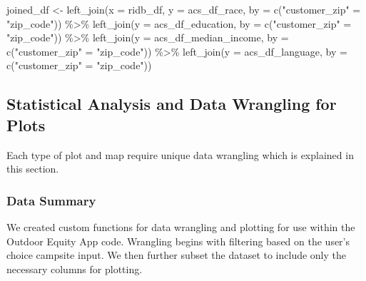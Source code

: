 \documentclass[
  11 pt,
  openany]{book}
\newenvironment{Shaded}{\begin{snugshade}}{\end{snugshade}}
\newcommand{\AttributeTok}[1]{\textcolor[rgb]{0.77,0.63,0.00}{#1}}
\newcommand{\FunctionTok}[1]{\textcolor[rgb]{0.00,0.00,0.00}{#1}}
\newcommand{\NormalTok}[1]{#1}
\newcommand{\OtherTok}[1]{\textcolor[rgb]{0.56,0.35,0.01}{#1}}
\newcommand{\SpecialCharTok}[1]{\textcolor[rgb]{0.00,0.00,0.00}{#1}}
\newcommand{\StringTok}[1]{\textcolor[rgb]{0.31,0.60,0.02}{#1}}
\begin{document}
\begin{Shaded}
\begin{Highlighting}[]
\NormalTok{joined\_df }\OtherTok{\textless{}{-}} 
  \FunctionTok{left\_join}\NormalTok{(}\AttributeTok{x =}\NormalTok{ ridb\_df,}
            \AttributeTok{y =}\NormalTok{ acs\_df\_race,}
            \AttributeTok{by =} \FunctionTok{c}\NormalTok{(}\StringTok{"customer\_zip"} \OtherTok{=} \StringTok{"zip\_code"}\NormalTok{)) }\SpecialCharTok{\%\textgreater{}\%} 
  \FunctionTok{left\_join}\NormalTok{(}\AttributeTok{y =}\NormalTok{ acs\_df\_education,}
            \AttributeTok{by =} \FunctionTok{c}\NormalTok{(}\StringTok{"customer\_zip"} \OtherTok{=} \StringTok{"zip\_code"}\NormalTok{)) }\SpecialCharTok{\%\textgreater{}\%} 
  \FunctionTok{left\_join}\NormalTok{(}\AttributeTok{y =}\NormalTok{ acs\_df\_median\_income,}
            \AttributeTok{by =} \FunctionTok{c}\NormalTok{(}\StringTok{"customer\_zip"} \OtherTok{=} \StringTok{"zip\_code"}\NormalTok{)) }\SpecialCharTok{\%\textgreater{}\%} 
  \FunctionTok{left\_join}\NormalTok{(}\AttributeTok{y =}\NormalTok{ acs\_df\_language,}
            \AttributeTok{by =} \FunctionTok{c}\NormalTok{(}\StringTok{"customer\_zip"} \OtherTok{=} \StringTok{"zip\_code"}\NormalTok{))}
\end{Highlighting}
\end{Shaded}

\hypertarget{statistical-analysis-and-data-wrangling-for-plots}{%
\subsection{Statistical Analysis and Data Wrangling for Plots}\label{statistical-analysis-and-data-wrangling-for-plots}}

Each type of plot and map require unique data wrangling which is explained in this section.

\hypertarget{data-summary}{%
\subsubsection{Data Summary}\label{data-summary}}

We created custom functions for data wrangling and plotting for use within the Outdoor Equity App code. Wrangling begins with filtering based on the user's choice campsite input. We then further subset the dataset to include only the necessary columns for plotting.
\end{document}
